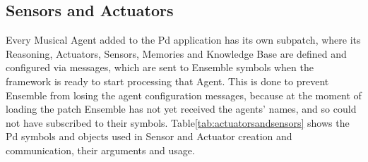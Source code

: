 \documentclass[a4paper, 11pt, twoside]{article}
\begin{document}
\begin{multicols}{2}

\subsection{Sensors and Actuators}

Every Musical Agent added to the Pd application has its own subpatch, where 
its Reasoning, Actuators, Sensors, Memories and Knowledge Base are defined and 
configured via messages, which are sent to Ensemble symbols when the framework 
is ready to start processing that Agent. This is done to prevent Ensemble from 
losing the agent configuration messages, because at the moment of loading the 
patch Ensemble has not yet received the agents' names, and so could not have 
subscribed to their symbols. Table\ref{tab:actuatorsandsensors} shows the Pd 
symbols and objects used in Sensor and Actuator creation and communication, 
their arguments and usage.

\end{multicols}
\end{document}
